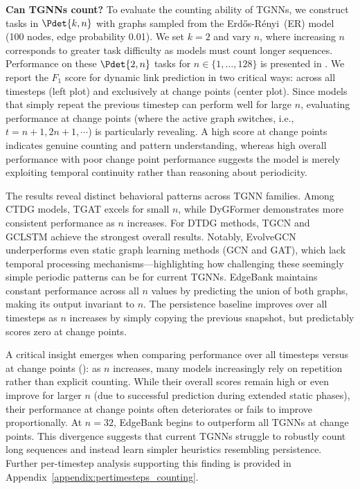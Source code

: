 
 \textbf{Can TGNNs count?} To evaluate the counting ability of TGNNs, we construct tasks in $\Pdet{k,n}$ with graphs sampled from the Erdős-Rényi~(ER) model~\citep{erdos1960evolution} (100 nodes, edge probability 0.01). We set $k = 2$ and vary $n$, where increasing $n$ corresponds to greater task difficulty as models must count longer sequences. 
Performance on these $\Pdet{2,n}$ tasks for $n \in \{1,\ldots,128\}$ is presented in . We report the $F_1$ score for dynamic link prediction in two critical ways: across all timesteps (left plot) and exclusively at change points (center plot).
Since models that simply repeat the previous timestep can perform well for large $n$, evaluating performance at change points (where the active graph switches, i.e., $t = n+1, 2n+1, \cdots$) is particularly revealing. A high score at change points indicates genuine counting and pattern understanding, whereas high overall performance with poor change point performance suggests the model is merely exploiting temporal continuity rather than reasoning about periodicity.

 The results reveal distinct behavioral patterns across TGNN families. Among CTDG models, TGAT excels for small $n$, while DyGFormer demonstrates more consistent performance as $n$ increases. For DTDG methods, TGCN and GCLSTM achieve the strongest overall results. Notably, EvolveGCN underperforms even static graph learning methods (GCN and GAT), which lack temporal processing mechanisms—highlighting how challenging these seemingly simple periodic patterns can be for current TGNNs. EdgeBank maintains constant performance across all $n$ values by predicting the union of both graphs, making its output invariant to $n$. The persistence baseline improves over all timesteps as $n$ increases by simply copying the previous snapshot, but predictably scores zero at change points.

 A critical insight emerges when comparing performance over all timesteps versus at change points (): as $n$ increases, many models increasingly rely on repetition rather than explicit counting. While their overall scores remain high or even improve for larger $n$ (due to successful prediction during extended static phases), their performance at change points often deteriorates or fails to improve proportionally. At $n = 32$, EdgeBank begins to outperform all TGNNs at change points. This divergence suggests that current TGNNs struggle to robustly count long sequences and instead learn simpler heuristics resembling persistence. Further per-timestep analysis supporting this finding is provided in Appendix~\ref{appendix:pertimesteps_counting}.



